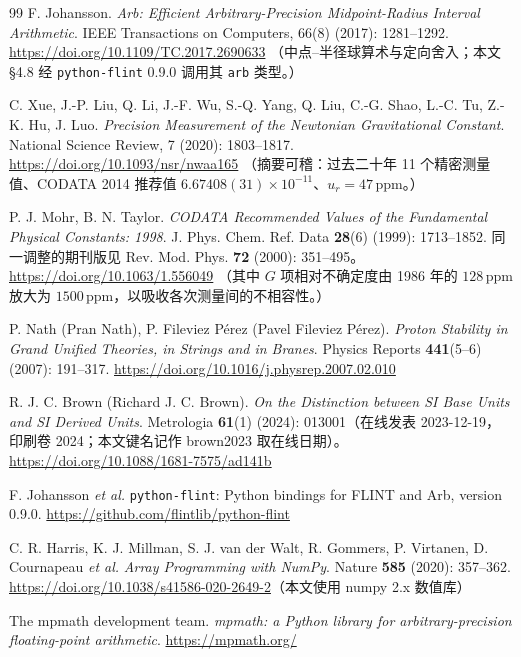 \documentclass[12pt,a4paper]{article}
\begin{document}
\begin{thebibliography}{99}
F. Johansson.
\textit{Arb: Efficient Arbitrary-Precision Midpoint-Radius Interval Arithmetic}.
IEEE Transactions on Computers, 66(8) (2017): 1281--1292.
\url{https://doi.org/10.1109/TC.2017.2690633}
（中点--半径球算术与定向舍入；本文 §4.8 经 \texttt{python-flint} 0.9.0 调用其 \texttt{arb} 类型。）

C. Xue, J.-P. Liu, Q. Li, J.-F. Wu, S.-Q. Yang, Q. Liu, C.-G. Shao, L.-C. Tu, Z.-K. Hu, J. Luo.
\textit{Precision Measurement of the Newtonian Gravitational Constant}.
National Science Review, 7 (2020): 1803--1817.
\url{https://doi.org/10.1093/nsr/nwaa165}
（摘要可稽：过去二十年 11 个精密测量值、CODATA 2014 推荐值 $6.67408(31)\times10^{-11}$、$u_r = 47\,\mathrm{ppm}$。）

P. J. Mohr, B. N. Taylor.
\textit{CODATA Recommended Values of the Fundamental Physical Constants: 1998}.
J. Phys. Chem. Ref. Data \textbf{28}(6) (1999): 1713--1852.
同一调整的期刊版见 Rev. Mod. Phys. \textbf{72} (2000): 351--495。
\url{https://doi.org/10.1063/1.556049}
（其中 $G$ 项相对不确定度由 1986 年的 $128\,\mathrm{ppm}$ 放大为 $1500\,\mathrm{ppm}$，以吸收各次测量间的不相容性。）

P. Nath (Pran Nath), P. Fileviez P\'erez (Pavel Fileviez P\'erez).
\textit{Proton Stability in Grand Unified Theories, in Strings and in Branes}.
Physics Reports \textbf{441}(5--6) (2007): 191--317.
\url{https://doi.org/10.1016/j.physrep.2007.02.010}

R. J. C. Brown (Richard J. C. Brown).
\textit{On the Distinction between SI Base Units and SI Derived Units}.
Metrologia \textbf{61}(1) (2024): 013001（在线发表 2023-12-19，印刷卷 2024；本文键名记作 brown2023 取在线日期）。
\url{https://doi.org/10.1088/1681-7575/ad141b}

F. Johansson \textit{et al.} \texttt{python-flint}: Python bindings for FLINT and Arb, version 0.9.0.
\url{https://github.com/flintlib/python-flint}

C. R. Harris, K. J. Millman, S. J. van der Walt, R. Gommers, P. Virtanen, D. Cournapeau \textit{et al.}
\textit{Array Programming with NumPy}.
Nature \textbf{585} (2020): 357--362. \url{https://doi.org/10.1038/s41586-020-2649-2}（本文使用 numpy 2.x 数值库）

The mpmath development team.
\textit{mpmath: a Python library for arbitrary-precision floating-point arithmetic}.
\url{https://mpmath.org/}


\end{thebibliography}
\end{document}
